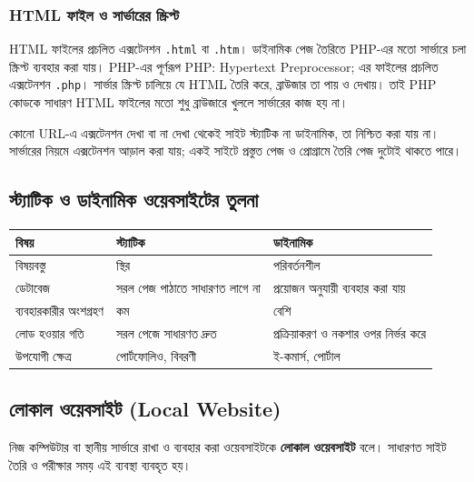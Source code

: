 \subsubsection{HTML ফাইল ও সার্ভারের স্ক্রিপ্ট}
HTML ফাইলের প্রচলিত এক্সটেনশন \texttt{.html} বা \texttt{.htm}। ডাইনামিক পেজ তৈরিতে PHP-এর মতো সার্ভারে চলা স্ক্রিপ্ট ব্যবহার করা যায়। PHP-এর পূর্ণরূপ PHP: Hypertext Preprocessor; এর ফাইলের প্রচলিত এক্সটেনশন \texttt{.php}। সার্ভার স্ক্রিপ্ট চালিয়ে যে HTML তৈরি করে, ব্রাউজার তা পায় ও দেখায়। তাই PHP কোডকে সাধারণ HTML ফাইলের মতো শুধু ব্রাউজারে খুললে সার্ভারের কাজ হয় না।

কোনো URL-এ এক্সটেনশন দেখা বা না দেখা থেকেই সাইট স্ট্যাটিক না ডাইনামিক, তা নিশ্চিত করা যায় না। সার্ভারের নিয়মে এক্সটেনশন আড়াল করা যায়; একই সাইটে প্রস্তুত পেজ ও প্রোগ্রামে তৈরি পেজ দুটোই থাকতে পারে।



\subsection{স্ট্যাটিক ও ডাইনামিক ওয়েবসাইটের তুলনা}
\begin{center}
\begin{tabular}{|p{}|p{}|p{}|}
\hline
\textbf{বিষয়} & \textbf{স্ট্যাটিক} & \textbf{ডাইনামিক} \\
\hline
বিষয়বস্তু & স্থির & পরিবর্তনশীল \\
\hline
ডেটাবেজ & সরল পেজ পাঠাতে সাধারণত লাগে না & প্রয়োজন অনুযায়ী ব্যবহার করা যায় \\
\hline
ব্যবহারকারীর অংশগ্রহণ & কম & বেশি \\
\hline
লোড হওয়ার গতি & সরল পেজে সাধারণত দ্রুত & প্রক্রিয়াকরণ ও নকশার ওপর নির্ভর করে \\
\hline
উপযোগী ক্ষেত্র & পোর্টফোলিও, বিবরণী & ই-কমার্স, পোর্টাল \\
\hline
\end{tabular}
\end{center}

\subsection{লোকাল ওয়েবসাইট (Local Website)}
\begin{definitionbox}{}
নিজ কম্পিউটার বা স্থানীয় সার্ভারে রাখা ও ব্যবহার করা ওয়েবসাইটকে \textbf{লোকাল ওয়েবসাইট} বলে। সাধারণত সাইট তৈরি ও পরীক্ষার সময় এই ব্যবস্থা ব্যবহৃত হয়।
\end{definitionbox}

